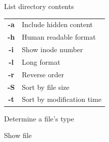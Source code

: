\documentclass[12pt, a4paper]
{article}
\begin{document}
\begin{multicols}{3}
\begin{description}[nolistsep]
	\item[ls] List directory contents
	\item
	\begin{tabular}{cl}
		{\large \ttfamily \textbf{-a}} & Include hidden content \\
		{\large \ttfamily \textbf{-h}} & Human readable format\\
		{\large \ttfamily \textbf{-i}} & Show inode number\\
		{\large \ttfamily \textbf{-l}} & Long format \\
		{\large \ttfamily \textbf{-r}} & Reverse order \\
		{\large \ttfamily \textbf{-S}} & Sort by file size \\
		{\large \ttfamily \textbf{-t}} & Sort by modification time\\
	\end{tabular}
	\item[file] Determine a file's type
	\item[less] Show file
\end{description}





\end{multicols}
\end{document}
